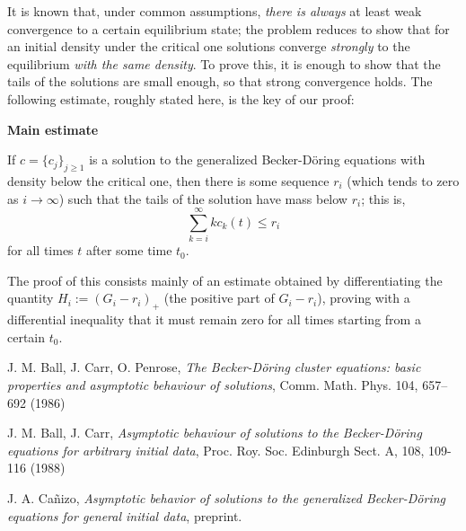 \documentclass{article}
\def\to{\rightarrow}
\begin{document}
\begin{multicols}{2}
It is known that, under common assumptions, \emph{there is always} at
least weak convergence to a certain equilibrium state;
\textcolor{rojo}{the problem reduces to show that for an initial
  density under the critical one solutions converge \emph{strongly} to
  the equilibrium \emph{with the same density}}. To prove this, it is
enough to show that the tails of the solutions are small enough, so
that strong convergence holds. The following estimate, roughly stated
here, is the key of our proof:

\noindent
\colorbox{marronrp3}{
  \begin{minipage}[t]{.96\linewidth}
    \vspace{.2cm}
    \centerline{\huge \textbf{Main estimate}}
    \vspace{.05cm}

    \Large
    If $c = \{c_j\}_{j \geq 1}$ is a solution to the generalized
    Becker-Döring equations with density below the critical one, then
    there is some sequence $r_i$ (which tends to zero as $i \to
    \infty$) such that the tails of the solution have mass below
    $r_i$; this is,
    \begin{equation*}
      \sum_{k=i}^\infty k c_k(t) \leq r_i
    \end{equation*}
    for all times $t$ after some time $t_0$.
    \\\hspace{.05cm}
  \end{minipage}
}

\vspace{.5cm}

The proof of this consists mainly of an estimate obtained by
differentiating the quantity $H_i := (G_i-r_i)_+$ (the positive part
of $G_i - r_i$), proving with a differential inequality that it must
remain zero for all times starting from a certain $t_0$.
%
\small
\begin{thebibliography}{}

 J. M. Ball, J. Carr, O. Penrose, \emph{The
    Becker-D\"oring cluster equations: basic properties and asymptotic
    behaviour of solutions}, Comm. Math. Phys. 104, 657--692 (1986)

 J. M. Ball, J. Carr, \emph{Asymptotic behaviour of
    solutions to the Becker-D\"oring equations for arbitrary initial
    data}, Proc. Roy. Soc. Edinburgh Sect. A, 108, 109-116 (1988)
  
 J. A. Cañizo, \emph{Asymptotic behavior of solutions to
    the generalized Becker-Döring equations for general initial data},
  preprint.
  

\end{thebibliography}
\end{multicols}
\end{document}
